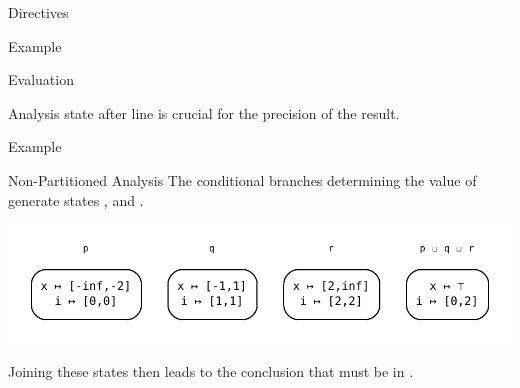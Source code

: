 \documentclass{beamer}
\begin{document}
\begin{section}{Directives}

	\begin{frame}[t]{Example}
		\begin{block}{Evaluation}
			
			Analysis state after line  is crucial for the precision of the result.
		\end{block}
	\end{frame}


	\begin{frame}[t]{Example}
		\begin{block}{Non-Partitioned Analysis}
			The conditional branches determining the value of  generate states ,  and .
			\begin{center}
				\includegraphics[scale=0.6]{Graphs/PartitionValueExample1.pdf}
			\end{center}
			Joining these states then leads to the conclusion that  must be in .
		\end{block}
	\end{frame}



\end{section}
\end{document}
